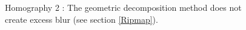 
\begin{figure}
\caption{Homography 2 : The geometric decomposition method does not create excess blur (see section \ref{Ripmap}).}
\label{Homo2}
\end{figure}



